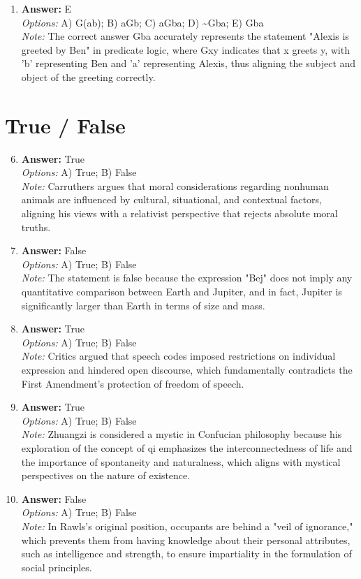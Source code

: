 \documentclass[12pt]{article}
\begin{document}
\begin{enumerate}[label=\arabic*.]
\item \textbf{Answer:} E
\\ \textit{Options:} A) G(ab); B) aGb; C) aGba; D) \textasciitilde{}Gba; E) Gba
\\ \textit{Note:} The correct answer Gba accurately represents the statement "Alexis is greeted by Ben" in predicate logic, where Gxy indicates that x greets y, with 'b' representing Ben and 'a' representing Alexis, thus aligning the subject and object of the greeting correctly.
\end{enumerate}

\section*{True / False}
\begin{enumerate}[label=\arabic*.]
\setcounter{enumi}{5}
\item \textbf{Answer:} True
\\ \textit{Options:} A) True; B) False
\\ \textit{Note:} Carruthers argues that moral considerations regarding nonhuman animals are influenced by cultural, situational, and contextual factors, aligning his views with a relativist perspective that rejects absolute moral truths.
\item \textbf{Answer:} False
\\ \textit{Options:} A) True; B) False
\\ \textit{Note:} The statement is false because the expression "Bej" does not imply any quantitative comparison between Earth and Jupiter, and in fact, Jupiter is significantly larger than Earth in terms of size and mass.
\item \textbf{Answer:} True
\\ \textit{Options:} A) True; B) False
\\ \textit{Note:} Critics argued that speech codes imposed restrictions on individual expression and hindered open discourse, which fundamentally contradicts the First Amendment's protection of freedom of speech.
\item \textbf{Answer:} True
\\ \textit{Options:} A) True; B) False
\\ \textit{Note:} Zhuangzi is considered a mystic in Confucian philosophy because his exploration of the concept of qi emphasizes the interconnectedness of life and the importance of spontaneity and naturalness, which aligns with mystical perspectives on the nature of existence.
\item \textbf{Answer:} False
\\ \textit{Options:} A) True; B) False
\\ \textit{Note:} In Rawls's original position, occupants are behind a "veil of ignorance," which prevents them from having knowledge about their personal attributes, such as intelligence and strength, to ensure impartiality in the formulation of social principles.
\end{enumerate}
\end{document}
